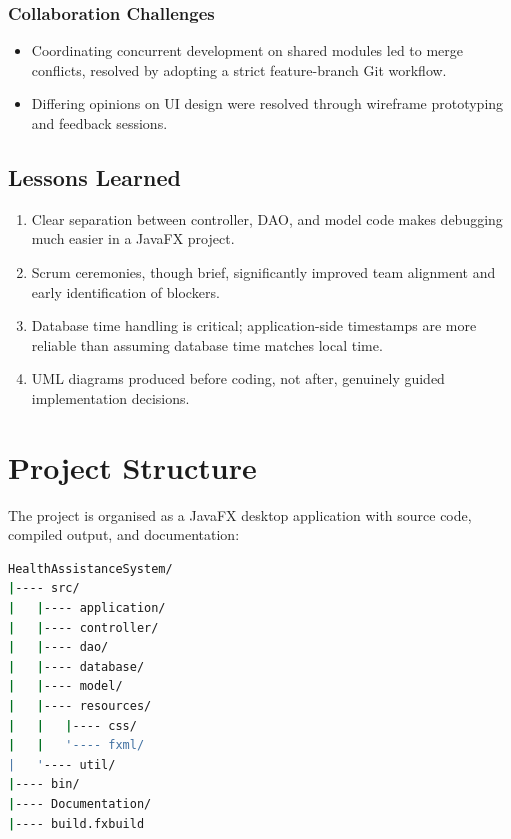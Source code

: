 \documentclass[12pt,a4paper]{report}
\begin{document}
\subsection{Collaboration Challenges}

\begin{itemize}[leftmargin=1.5cm]
  \item Coordinating concurrent development on shared modules led to merge conflicts, resolved by adopting a strict feature-branch Git workflow.
  \item Differing opinions on UI design were resolved through wireframe prototyping and feedback sessions.
\end{itemize}

\section{Lessons Learned}

\begin{enumerate}[leftmargin=1.5cm]
  \item Clear separation between controller, DAO, and model code makes debugging much easier in a JavaFX project.
  \item Scrum ceremonies, though brief, significantly improved team alignment and early identification of blockers.
  \item Database time handling is critical; application-side timestamps are more reliable than assuming database time matches local time.
  \item UML diagrams produced before coding, not after, genuinely guided implementation decisions.
\end{enumerate}

\chapter{Project Structure}

The project is organised as a JavaFX desktop application with source code, compiled output, and documentation:

\begin{lstlisting}[language=bash, caption={Project Directory Structure}]
HealthAssistanceSystem/
|---- src/
|   |---- application/
|   |---- controller/
|   |---- dao/
|   |---- database/
|   |---- model/
|   |---- resources/
|   |   |---- css/
|   |   '---- fxml/
|   '---- util/
|---- bin/
|---- Documentation/
|---- build.fxbuild
\end{lstlisting}
\end{document}
